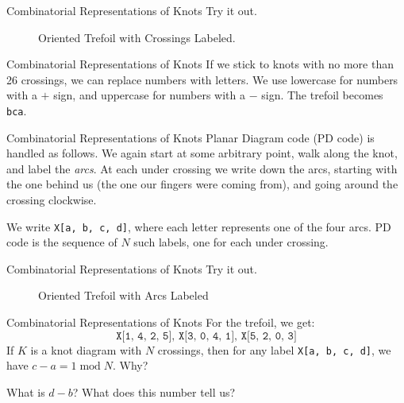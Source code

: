 \documentclass{beamer}
\begin{document}
    \begin{frame}{Combinatorial Representations of Knots}
        Try it out.
        \begin{figure}
            \centering
            \caption{Oriented Trefoil with Crossings Labeled.}
        \end{figure}
    \end{frame}
    \begin{frame}{Combinatorial Representations of Knots}
        If we stick to knots with no more than 26 crossings, we can replace
        numbers with letters. We use lowercase for numbers with a $+$ sign, and
        uppercase for numbers with a $-$ sign. The trefoil becomes
        \texttt{bca}.
    \end{frame}
    \begin{frame}{Combinatorial Representations of Knots}
        Planar Diagram code (PD code) is handled as follows. We again start at
        some arbitrary point, walk along the knot, and label the \textit{arcs}.
        At each under crossing we write down the arcs, starting with the one
        behind us (the one our fingers were coming from),
        and going around the crossing clockwise.
        \par\hfill\par
        We write \texttt{X[a, b, c, d]}, where each letter represents one of the
        four arcs. PD code is the sequence of $N$ such labels, one for each
        under crossing.
    \end{frame}
    \begin{frame}{Combinatorial Representations of Knots}
        Try it out.
        \begin{figure}
            \centering
            \caption{Oriented Trefoil with Arcs Labeled}
        \end{figure}
    \end{frame}
    \begin{frame}{Combinatorial Representations of Knots}
        For the trefoil, we get:
        \begin{equation}
            \texttt{X[1, 4, 2, 5]},\,
            \texttt{X[3, 0, 4, 1]},\,
            \texttt{X[5, 2, 0, 3]}
        \end{equation}
        If $K$ is a knot diagram with $N$ crossings, then for any label
        \texttt{X[a, b, c, d]}, we have $c-a=1\operatorname{mod}N$.
        Why?
        \par\hfill\par
        What is $d-b$? What does this number tell us?
    \end{frame}
\end{document}
